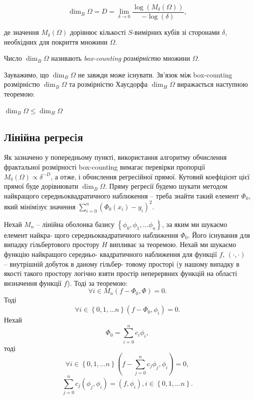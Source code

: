 $$\dim_{B}\Omega = D = \lim_{\delta \rightarrow 0} \frac{\log(M_{\delta}(\Omega))}{-\log(\delta)},$$

де значення $M_{\delta}(\Omega)$ дорівнює кількості $S$-вимірних кубів зі сторонами $\delta$, необхідних для покриття множини $\Omega$. 

\begin{defn}
	Число $\dim_{B}\Omega$ називають \emph{box-counting розмірністю} множини $\Omega$.
\end{defn}

Зауважимо, що $\dim_{B}\Omega$ не завжди може існувати. Зв'язок між box-counting розмірністю $\dim_{B}\Omega$ та розмірністю Хаусдорфа $\dim_{H}\Omega$ виражається наступною теоремою:

\begin{thm}
	$\dim_{B}\Omega \leq \dim_{H}\Omega$
\end{thm}


\subsection{Лінійна регресiя}

Як зазначено у попередньому пункті, використання алгоритму обчислення фрактальної розмірності box-countіng вимагає перевірки пропорції $M_{\delta}(\Omega) \propto \delta^{-D}$, а отже, і обчислення регресійної прямої. Кутовий коефіцієнт цієї прямої буде дорівнювати $\dim_{B}\Omega$. Пряму регресії будемо шукати методом найкращого середньоквадратичного наближення -- треба знайти такий елемент $\Phi_0$, який мінімізує значення  $\sum_{i=0}^{n}{\left( \Phi_0(x_i) - y_i \right)^2}$.

Нехай $M_n$ – лінійна оболонка базису $\left\{ \phi_0, \phi_1, \dots \phi_n\right\}$, за яким ми шукаємо елемент найкра- щого середньоквадратичного наближення $\Phi_0$. Його існування для випадку гільбертового простору $H$ випливає за теоремою. Нехай ми шукаємо функцію найкращого середньо- квадратичного наближення для функції $f$, $\left( \cdot, \cdot \right)$ – внутрішній добуток в даному гільбер- товому просторі (у нашому випадку в якості такого простору логічно взяти простір неперервних функцій на області визначення функції $f$). Тоді за теоремою: $$\forall i \in M_n \left( f-\Phi_0, \Phi\right)=0.$$ Тоді $$\forall i \in \left\{ 0, 1, \dots n\right\} \left( f-\Phi_0, \phi_i\right)=0.$$ Нехай $$\Phi_0 = \sum_{i=0}^n {c_i \phi_i},$$ тоді $$\forall i \in \left\{ 0, 1, \dots n\right\} \left( f-\sum_{j=0}^n c_j \phi_j, \phi_i \right) = 0,$$ $$\sum_{j=0}^n {c_j \left(\phi_j, \phi_i \right)} = \left(f, \phi_i \right), i \in \left\{ 0, 1, \dots n \right\}.$$

